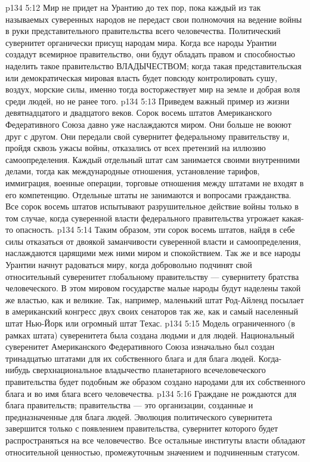\vs p134 5:12 \pc Мир не придет на Урантию до тех пор, пока каждый из так называемых суверенных народов не передаст свои полномочия на ведение войны в руки представительного правительства всего человечества. Политический сувернитет органически присущ народам мира. Когда все народы Урантии создадут всемирное правительство, они будут обладать правом и способностью наделить такое правительство ВЛАДЫЧЕСТВОМ; когда такая представительская или демократическая мировая власть будет повсюду контролировать сушу, воздух, морские силы, именно тогда восторжествует мир на земле и добрая воля среди людей, но не ранее того.
\vs p134 5:13 Приведем важный пример из жизни девятнадцатого и двадцатого веков. Сорок восемь штатов Американского Федеративного Союза давно уже наслаждаются миром. Они больше не воюют друг с другом. Они передали свой сувернитет федеральному правительству и, пройдя сквозь ужасы войны, отказались от всех претензий на иллюзию самоопределения. Каждый отдельный штат сам занимается своими внутренними делами, тогда как международные отношения, установление тарифов, иммиграция, военные операции, торговые отношения между штатами не входят в его компетенцию. Отдельные штаты не занимаются и вопросами гражданства. Все сорок восемь штатов испытывают разрушительное действие войны только в том случае, когда суверенной власти федерального правительства угрожает какая\hyp{}то опасность.
\vs p134 5:14 \pc Таким образом, эти сорок восемь штатов, найдя в себе силы отказаться от двоякой заманчивости суверенной власти и самоопределения, наслаждаются царящими меж ними миром и спокойствием. Так же и все народы Урантии начнут радоваться миру, когда добровольно подчинят свой относительный суверенитет глобальному правительству --- сувернитету братства человеческого. В этом мировом государстве малые народы будут наделены такой же властью, как и великие. Так, например, маленький штат Род\hyp{}Айленд посылает в американский конгресс двух своих сенаторов так же, как и самый населенный штат Нью\hyp{}Йорк или огромный штат Техас.
\vs p134 5:15 Модель ограниченного (в рамках штата) суверенитета была создана людьми и для людей. Национальный суверенитет Американского Федеративного Союза изначально был создан тринадцатью штатами для их собственного блага и для блага людей. Когда\hyp{}нибудь сверхнациональное владычество планетарного всечеловеческого правительства будет подобным же образом создано народами для их собственного блага и во имя блага всего человечества.
\vs p134 5:16 Граждане не рождаются для блага правительств; правительства --- это организации, созданные и предназначенные для блага людей. Эволюция политического сувернитета завершится только с появлением правительства, сувернитет которого будет распространяться на все человечество. Все остальные институты власти обладают относительной ценностью, промежуточным значением и подчиненным статусом.
